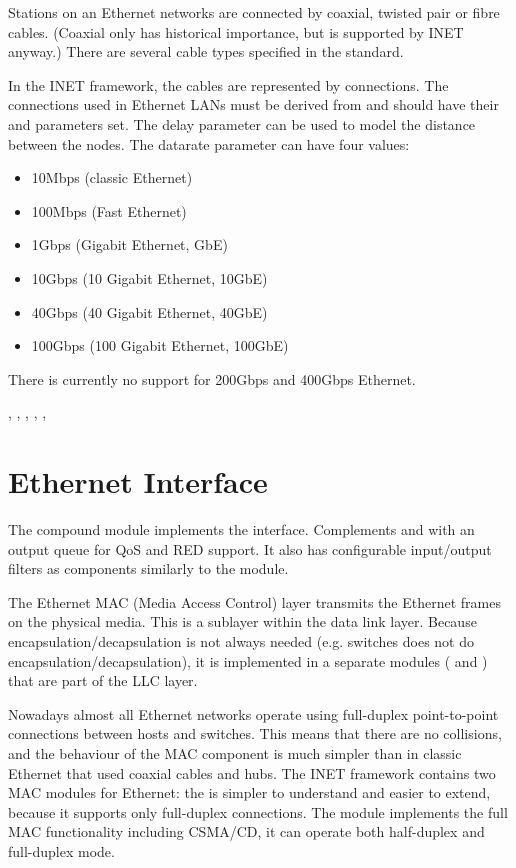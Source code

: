 Stations on an Ethernet networks are connected by coaxial,
twisted pair or fibre cables. (Coaxial only has historical importance,
but is supported by INET anyway.) There are several cable types specified
in the standard.

In the INET framework, the cables are represented by connections.
The connections used in Ethernet LANs must be derived from
 and should have their  and
 parameters set.
The delay parameter can be used to model the distance between the
nodes. The datarate parameter can have four values:

\begin{itemize}
  \item 10Mbps (classic Ethernet)
  \item 100Mbps (Fast Ethernet)
  \item 1Gbps (Gigabit Ethernet, GbE)
  \item 10Gbps (10 Gigabit Ethernet, 10GbE)
  \item 40Gbps (40 Gigabit Ethernet, 40GbE)
  \item 100Gbps (100 Gigabit Ethernet, 100GbE)
\end{itemize}

There is currently no support for 200Gbps and 400Gbps Ethernet.

, , , ,
, 

\section{Ethernet Interface}

The  compound module implements the 
interface. Complements  and  with an output queue
for QoS and RED support. It also has configurable input/output filters as 
components similarly to the  module.

The Ethernet MAC (Media Access Control) layer transmits the Ethernet frames on
the physical media. This is a sublayer within the data link layer. Because
encapsulation/decapsulation is not always needed (e.g. switches does not do
encapsulation/decapsulation), it is implemented in a separate modules
( and ) that are part of the LLC layer.


Nowadays almost all Ethernet networks operate using full-duplex
point-to-point connections between hosts and switches. This means
that there are no collisions, and the behaviour of the MAC component
is much simpler than in classic Ethernet that used coaxial cables and
hubs. The INET framework contains two MAC modules for Ethernet:
the  is simpler to understand and easier to extend,
because it supports only full-duplex connections. The 
module implements the full MAC functionality including CSMA/CD, it
can operate both half-duplex and full-duplex mode.


